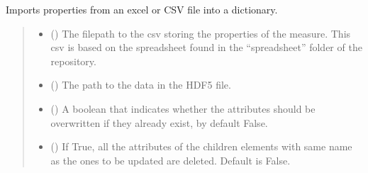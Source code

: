\documentclass[letterpaper,10pt,english]{sphinxmanual}
\begin{document}
\begin{fulllineitems}
\begin{fulllineitems}
\label{\detokenize{source/_autosummary/HDF5_BLS.Wrapper:HDF5_BLS.Wrapper.import_properties_data}}
\pysigstartsignatures
\pysiglinewithargsret
{}
{\sphinxparamcomma {}\sphinxparamcomma {}\sphinxparamcomma {}}
{}
\pysigstopsignatures
\sphinxAtStartPar
Imports properties from an excel or CSV file into a dictionary.
\begin{quote}\begin{description}
\begin{itemize}
\item {} 
\sphinxAtStartPar
{} () \textendash{} The filepath to the csv storing the properties of the measure. This csv is based on the spreadsheet found in the “spreadsheet” folder of the repository.

\item {} 
\sphinxAtStartPar
{} () \textendash{} The path to the data in the HDF5 file.

\item {} 
\sphinxAtStartPar
{} (\sphinxstyleliteralemphasis{\sphinxupquote{, }}) \textendash{} A boolean that indicates whether the attributes should be overwritten if they already exist, by default False.

\item {} 
\sphinxAtStartPar
{} (\sphinxstyleliteralemphasis{\sphinxupquote{, }}) \textendash{} If True, all the attributes of the children elements with same name as the ones to be updated are deleted. Default is False.

\end{itemize}

\end{description}\end{quote}


\end{fulllineitems}
\end{fulllineitems}
\end{document}
